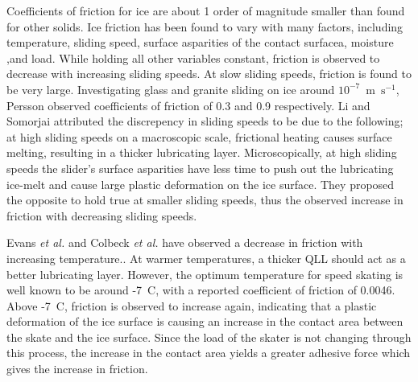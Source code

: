 Coefficients of friction for ice are about 1 order of magnitude
smaller than found for other solids. Ice friction has been found to
vary with many factors, including
temperature\cite{Roberts1981,Higgins2008,Bowden1939,Evans1976,Derjaguin1988,Liang2003},
sliding speed\cite{Evans1976,Derjaguin1988,Liang2003}, surface
asparities of the contact surfacea\cite{Bowden1939,Baurle2007},
moisture\cite{Calabrese1980} ,and
load.\cite{Buhl2001,Bowden1939,Derjaguin1988,Baurle2006,Oksanen1982}
While holding all other variables constant, friction is observed to
decrease with increasing sliding speeds. At slow sliding speeds,
friction is found to be very large. Investigating glass and granite
sliding on ice around $10^{-7}$~m~$\mathrm{s}^{-1}$, Persson observed
coefficients of friction of 0.3 and 0.9
respectively.\cite{Persson2001} Li and Somorjai attributed the
discrepency in sliding speeds to be due to the following; at high
sliding speeds on a macroscopic scale, frictional heating causes
surface melting, resulting in a thicker lubricating layer.
Microscopically, at high sliding speeds the slider's surface
asparities have less time to push out the lubricating ice-melt and
cause large plastic deformation on the ice surface.\cite{Li2007} They
proposed the opposite to hold true at smaller sliding speeds, thus the
observed increase in friction with decreasing sliding speeds.

Evans \textit{et al.} and Colbeck \textit{et al.} have observed a
decrease in friction with increasing
temperature.\cite{Evans1976,Colbeck1997}. At warmer temperatures, a
thicker QLL should act as a better lubricating layer. However, the
optimum temperature for speed skating is well known to be around
-7\degree~C, with a reported coefficient of friction of
0.0046.\cite{Dekoning1992} Above -7\degree~C, friction is observed to
increase again, indicating that a plastic deformation of the ice
surface is causing an increase in the contact area between the skate
and the ice surface.\cite{Barnes1966,Barnes1971} Since the load of the
skater is not changing through this process, the increase in the
contact area yields a greater adhesive force which gives the increase
in friction.

